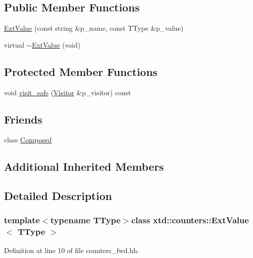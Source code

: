 \subsection*{Public Member Functions}
\begin{DoxyCompactItemize}
\item 
\hyperlink{classxtd_1_1counters_1_1ExtValue_ac56f634edb50ac47aca158e479bebeae}{Ext\-Value} (const string \&p\-\_\-name, const T\-Type \&p\-\_\-value)
\item 
virtual \hyperlink{classxtd_1_1counters_1_1ExtValue_a33aa51f76d3abae665265f3cea64a293}{$\sim$\-Ext\-Value} (void)
\end{DoxyCompactItemize}
\subsection*{Protected Member Functions}
\begin{DoxyCompactItemize}
\item 
void \hyperlink{classxtd_1_1counters_1_1ExtValue_af9ea755a42e20d03d325edfe27e05a75}{visit\-\_\-safe} (\hyperlink{classxtd_1_1counters_1_1Visitor}{Visitor} \&p\-\_\-visitor) const 
\end{DoxyCompactItemize}
\subsection*{Friends}
\begin{DoxyCompactItemize}
\item 
class \hyperlink{classxtd_1_1counters_1_1ExtValue_a93e934ad70d5b32b14beed5572450abf}{Composed}
\end{DoxyCompactItemize}
\subsection*{Additional Inherited Members}


\subsection{Detailed Description}
\subsubsection*{template$<$typename T\-Type$>$class xtd\-::counters\-::\-Ext\-Value$<$ T\-Type $>$}



Definition at line 10 of file counters\-\_\-fwd.\-hh.



